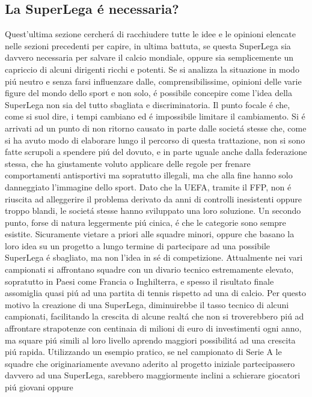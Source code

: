 \documentclass[
    corpo=12pt,
    oneside,
    evenboxes,
    tipotesi=triennale,
    stile=classica,
    oldstyle,
    autoretitolo,
    greek,
]{toptesi}
\begin{document}
\begin{interlinea}{1.5}
\section{La SuperLega \'e necessaria?}
Quest'ultima sezione cercher\'a di racchiudere tutte le idee e le opinioni elencate nelle sezioni precedenti per capire, in ultima battuta,
se questa SuperLega sia davvero necessaria per salvare il calcio mondiale, oppure sia semplicemente un capriccio di alcuni dirigenti
ricchi e potenti.\newline
Se si analizza la situazione in modo pi\'u neutro e senza farsi influenzare dalle, comprensibilissime, opinioni delle varie figure del mondo 
dello sport e non solo, \'e possibile concepire come l'idea della SuperLega non sia del tutto sbagliata e discriminatoria.
Il punto focale \'e che, come si suol dire, i tempi cambiano ed \'e impossibile limitare il cambiamento. Si \'e arrivati ad un punto di non ritorno
causato in parte dalle societ\'a stesse che, come si ha avuto modo di elaborare lungo il percorso di questa trattazione, non si sono fatte scrupoli 
a spendere pi\'u del dovuto, e in parte uguale anche dalla federazione stessa, che ha giustamente voluto applicare delle regole per frenare comportamenti antisportivi 
ma sopratutto illegali, ma che alla fine hanno solo danneggiato l'immagine dello sport. Dato che la UEFA, tramite il FFP, non \'e riuscita
ad alleggerire il problema derivato da anni di controlli inesistenti oppure troppo blandi, le societ\'a stesse hanno sviluppato una loro soluzione.
Un secondo punto, forse di natura leggermente pi\'u cinica, \'e che le categorie sono sempre esistite. Sicuramente vietare a priori alle squadre
minori, oppure che basano la loro idea su un progetto a lungo termine di partecipare ad una possibile SuperLega \'e sbagliato, 
ma non l'idea in s\'e di competizione. Attualmente nei vari campionati si affrontano squadre con un divario tecnico estremamente elevato, 
sopratutto in Paesi come Francia o Inghilterra, e spesso il risultato finale assomiglia quasi pi\'u ad una partita di tennis rispetto ad una
di calcio. Per questo motivo la creazione di una SuperLega, diminuirebbe il tasso tecnico di alcuni campionati, facilitando la crescita di alcune realt\'a 
che non si troverebbero pi\'u ad affrontare strapotenze con centinaia di milioni di euro di investimenti ogni anno, ma square pi\'u simili al loro livello
aprendo maggiori possibilit\'a ad una crescita pi\'u rapida. Utilizzando un esempio pratico, se nel campionato di Serie A le squadre che originariamente avevano
aderito al progetto iniziale partecipassero davvero ad una SuperLega, sarebbero maggiormente inclini a schierare giocatori pi\'u giovani oppure

\end{interlinea}
\end{document}
